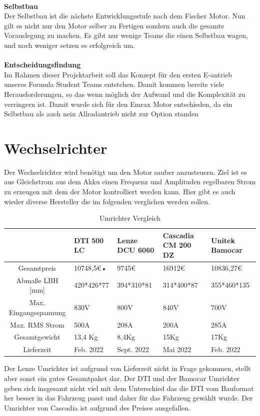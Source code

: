 \\
\textbf{Selbstbau}\\
Der Selbstbau ist die nächste Entwicklungsstufe nach dem Fischer Motor. Nun gilt es nicht nur den Motor selber zu Fertigen sondern auch die gesamte Vorauslegung zu machen. Es gibt nur wenige Teams die einen Selbstbau wagen, und noch weniger setzen es erfolgreich um.\\
\\
\textbf{Entscheidungsfindung}\\
Im Rahmen dieser Projektarbeit soll das Konzept für den ersten E-antrieb unseres Formula Student Teams entstehen. Damit kommen bereits viele Herausforderungen, so das wenn möglich der Aufwand und die Komplexität zu verringern ist. Damit wurde sich für den Emrax Motor entschieden, da ein Selbstbau als auch nein Allradantrieb nicht zur Option standen

\section{Wechselrichter}
Der Wechselrichter wird benötigt um den Motor sauber anzusteuern. Ziel ist es aus Gleichstrom aus dem Akku einen Frequenz und Amplituden regelbaren Strom zu erzeugen mit dem der Motor kontrolliert werden kann. Hier gibt es auch wieder diverse Hersteller die im folgenden verglichen werden sollen.

\begin{table}
	\centering
	\caption{Umrichter Vergleich}
	\label{tab:Umrichter Vergleicht}
\begin{tabular}{|c|p{}|p{}|p{}|p{}|}
	\hline
	& DTI 500 LC & Lenze DCU 6060 & Cascadia CM 200 DZ & Unitek Bamocar\\
	\hline
	Gesamtpreis & 10748,5€• & 9745€ & 16912€ & 10836,27€\\
	\hline
	Abmaße LBH [mm] & 420*426*77 & 394*310*81 & 314*400*87 & 355*460*135\\
	\hline
	Max. Eingangsspannung & 830V & 800V & 840V & 700V\\
	\hline
	Max. RMS Strom & 500A & 208A & 200A & 285A\\
	\hline
	Gesamtgewicht & 13,4 Kg & 8,4Kg & 15Kg & 17Kg\\
	\hline
	Lieferzeit & Feb. 2022 & Sept. 2022 & Mai 2022 & Feb. 2022\\
	\hline
\end{tabular}
\end{table}

Der Lenze Umrichter ist aufgrund von Lieferzeit nicht in Frage gekommen, stellt aber sonst ein gutes Gesamtpaket dar. Der DTI und der Bamocar Umrichter geben sich insgesamt nicht viel mit dem Unterschied das die DTI vom Bauformat her besser in das Fahrzeug passt und daher für das Fahrzeug gewählt wurde. Der Umrichter von Cascadia ist aufgrund des Preises ausgefallen.

